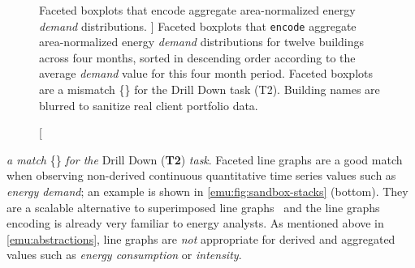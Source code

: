 
\begin{figure}
	\centering
	\caption
	[
	    Faceted boxplots that encode aggregate area-normalized energy \textsl{demand} distributions.
	]
	{
	    Faceted boxplots that {\tt encode} aggregate area-normalized energy \textsl{demand} distributions for twelve buildings across four months, sorted in descending order according to the average \textsl{demand} value for this four month period. Faceted boxplots are a mismatch \{\mismatch\} for the Drill Down task (T2). Building names are blurred to sanitize real client portfolio data.
	}
	\centering
	\label{emu:fig:sandbox-faceted-boxplot}
\end{figure} 


 {\it a match} \{\match\} {\it for the} Drill Down ({\bf T2}) {\it task}.
Faceted line graphs are a good match when observing non-derived continuous quantitative time series values such as {\it energy demand}; an example is shown in \autoref{emu:fig:sandbox-stacks} (bottom).
They are a scalable alternative to superimposed line graphs~\cite{Javed2010} and the line graphs encoding is already very familiar to energy analysts.
As mentioned above in \autoref{emu:abstractions}, line graphs are {\it not} appropriate for derived and aggregated values such as {\it energy consumption} or {\it intensity}.


